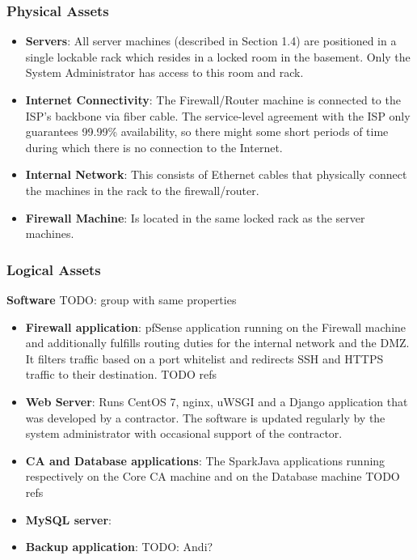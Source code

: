 \documentclass[english]{article}
\begin{document}
\subsubsection{\textbf{Physical Assets}}
\begin{itemize}
\item \textbf{Servers}: All server machines (described in Section 1.4) are positioned in a single lockable rack which resides in a locked room in the basement. Only the System Administrator has access to this room and rack.
\item \textbf{Internet Connectivity}: The Firewall/Router machine is connected to the ISP's backbone via fiber cable. The service-level agreement with the ISP only guarantees 99.99\% availability, so there might some short
periods of time during which there is no connection to the Internet.
\item \textbf{Internal Network}: This consists of Ethernet cables that physically connect the machines in the rack to the firewall/router.
\item \textbf{Firewall Machine}: Is located in the same locked rack as the server machines. 
\end{itemize}


\subsubsection{\textbf{Logical Assets}}

\textbf{Software}
TODO: group with same properties
\begin{itemize}
\item \textbf{Firewall application}: pfSense application running on the Firewall machine and additionally fulfills routing duties for the internal network and the DMZ. It filters traffic based on a port whitelist and redirects
SSH and HTTPS traffic to their destination. TODO refs
\item \textbf{Web Server}: Runs CentOS 7, nginx, uWSGI and a Django application that was developed by a contractor. The software is updated regularly by the system administrator with occasional support of the contractor. 
\item \textbf{CA and Database applications}: The SparkJava applications running respectively on the Core CA machine and on the Database machine TODO refs
\item \textbf{MySQL server}:
\item \textbf{Backup application}: TODO: Andi?
\end{itemize}
\end{document}
